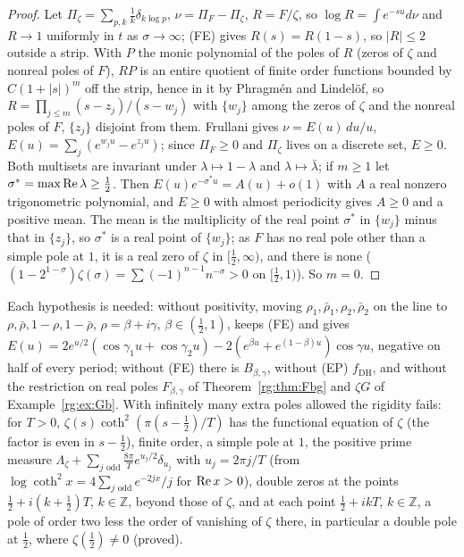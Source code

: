 \begin{proof}
Let $\Pi_\zeta=\sum_{p,k}\frac1k\delta_{k\log p}$, $\nu=\Pi_F-\Pi_\zeta$, $R=F/\zeta$, so $\log R=\int e^{-su}d\nu$ and $R\to1$ uniformly in $t$ as $\sigma\to\infty$; (FE) gives $R(s)=R(1-s)$, so $|R|\le2$ outside a strip. With $P$ the monic polynomial of the poles of $R$ (zeros of $\zeta$ and nonreal poles of $F$), $RP$ is an entire quotient of finite order functions bounded by $C(1+|s|)^m$ off the strip, hence in it by Phragm\'en and Lindel\"of, so $R=\prod_{j\le m}(s-z_j)/(s-w_j)$ with $\{w_j\}$ among the zeros of $\zeta$ and the nonreal poles of $F$, $\{z_j\}$ disjoint from them. Frullani gives $\nu=E(u)\,du/u$, $E(u)=\sum_j(e^{w_ju}-e^{z_ju})$; since $\Pi_F\ge0$ and $\Pi_\zeta$ lives on a discrete set, $E\ge0$. Both multisets are invariant under $\lambda\mapsto1-\lambda$ and $\lambda\mapsto\bar\lambda$; if $m\ge1$ let $\sigma^*=\max\operatorname{Re}\lambda\ge\frac12$. Then $E(u)e^{-\sigma^*u}=A(u)+o(1)$ with $A$ a real nonzero trigonometric polynomial, and $E\ge0$ with almost periodicity gives $A\ge0$ and a positive mean. The mean is the multiplicity of the real point $\sigma^*$ in $\{w_j\}$ minus that in $\{z_j\}$, so $\sigma^*$ is a real point of $\{w_j\}$; as $F$ has no real pole other than a simple pole at $1$, it is a real zero of $\zeta$ in $[\frac12,\infty)$, and there is none ($(1-2^{1-\sigma})\zeta(\sigma)=\sum(-1)^{n-1}n^{-\sigma}>0$ on $[\frac12,1)$). So $m=0$. \qedhere
\end{proof}

Each hypothesis is needed: without positivity, moving $\rho_1,\bar\rho_1,\rho_2,\bar\rho_2$ on the line to $\rho,\bar\rho,1-\rho,1-\bar\rho$, $\rho=\beta+i\gamma$, $\beta\in(\frac12,1)$, keeps (FE) and gives $E(u)=2e^{u/2}(\cos\gamma_1u+\cos\gamma_2u)-2(e^{\beta u}+e^{(1-\beta)u})\cos\gamma u$, negative on half of every period; without (FE) there is $B_{\beta,\gamma}$, without (EP) $f_{\mathrm{DH}}$, and without the restriction on real poles $F_{\beta,\gamma}$ of Theorem~\ref{rg:thm:Fbg} and $\zeta G$ of Example~\ref{rg:ex:Gb}. With infinitely many extra poles allowed the rigidity fails: for $T>0$, $\zeta(s)\coth^2(\pi(s-\frac12)/T)$ has the functional equation of $\zeta$ (the factor is even in $s-\frac12$), finite order, a simple pole at $1$, the positive prime measure $\Lambda_\zeta+\sum_{j\text{ odd}}\frac{8\pi}Te^{u_j/2}\delta_{u_j}$ with $u_j=2\pi j/T$ (from $\log\coth^2x=4\sum_{j\text{ odd}}e^{-2jx}/j$ for $\operatorname{Re} x>0$), double zeros at the points $\frac12+i(k+\frac12)T$, $k\in\mathbb Z$, beyond those of $\zeta$, and at each point $\frac12+ikT$, $k\in\mathbb Z$, a pole of order two less the order of vanishing of $\zeta$ there, in particular a double pole at $\frac12$, where $\zeta(\frac12)\ne0$ (proved).


